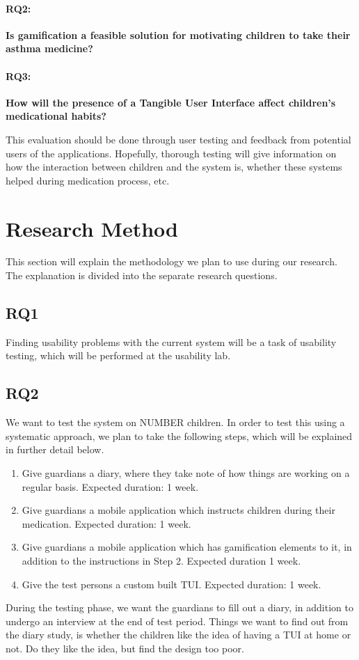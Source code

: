 \paragraph{RQ2:}
\textbf{Is gamification a feasible solution for motivating children to take their asthma medicine?}


\paragraph{RQ3:}
\textbf{How will the presence of a Tangible User Interface affect children's medicational habits?}


This evaluation should be done through user testing and feedback from potential users of the applications. Hopefully, thorough testing will give information on how the interaction between children and the system is, whether these systems helped during medication process, etc. 

\section{Research Method}
\label{sec:researchmethod}
This section will explain the methodology we plan to use during our research. The explanation is divided into the separate research questions.  


\subsection{RQ1}
\label{sec:RQ1-methodology}
Finding usability problems with the current system will be a task of usability testing, which will be performed at the usability lab.  


\subsection{RQ2}
\label{sec:RQ2-methodology}
We want to test the system on NUMBER children. In order to test this using a systematic approach, we plan to take the following steps, which will be explained in further detail below. 
\begin{enumerate}
  \item Give guardians a diary, where they take note of how things are working on a regular basis. Expected duration: 1 week.
  \item Give guardians a mobile application which instructs children during their medication. Expected duration: 1 week. 
  \item Give guardians a mobile application which has gamification elements to it, in addition to the instructions in Step 2. Expected duration 1 week.   
  \item Give the test persons a custom built TUI. Expected duration: 1 week. 
\end{enumerate}
During the testing phase, we want the guardians to fill out a diary, in addition to undergo an interview at the end of test period. Things we want to find out from the diary study, is whether the children like the idea of having a TUI at home or not. Do they like the idea, but find the design too poor.


